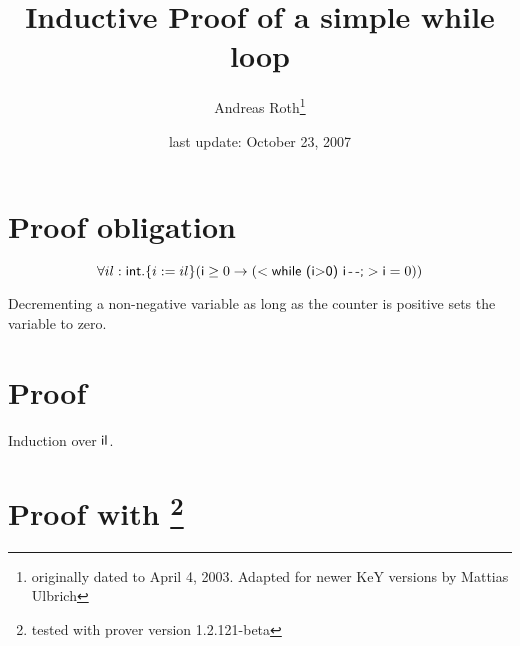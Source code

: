 \documentclass[11pt]{article}
\newcommand{\java}[1]{\mbox{\textsf{#1}}}
\begin{document}
\title{Inductive Proof of a simple while loop}
\author{Andreas Roth\footnote{originally dated to April 4, 2003. Adapted for newer KeY versions by Mattias Ulbrich}}
\date{last update: October 23, 2007}
\maketitle

\section*{Proof obligation}
\[ \forall il:\java{int}. \{i:=il\}(\java{i}\geq 0 \rightarrow ( <\java{while (i$>$0) i\,-\,-;}> \java{i}=0))\]

\noindent Decrementing a non-negative variable as long as the counter is
positive sets the variable to zero.

\section*{Proof}

Induction over $\java{il}$.

\section*{Proof with \KeY\footnote{tested with prover version 1.2.121-beta}}
\end{document}
